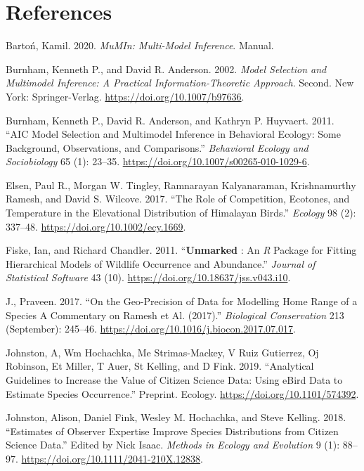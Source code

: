 \documentclass[
]{article}
\begin{document}
\clearpage

\hypertarget{references}{%
\section{References}\label{references}}

\hypertarget{refs}{}
\leavevmode\hypertarget{ref-MuMIn}{}%
Bartoń, Kamil. 2020. \emph{MuMIn: Multi-Model Inference}. Manual.

\leavevmode\hypertarget{ref-burnham2002a}{}%
Burnham, Kenneth P., and David R. Anderson. 2002. \emph{Model Selection and Multimodel Inference: A Practical Information-Theoretic Approach}. Second. New York: Springer-Verlag. \url{https://doi.org/10.1007/b97636}.

\leavevmode\hypertarget{ref-burnham2011}{}%
Burnham, Kenneth P., David R. Anderson, and Kathryn P. Huyvaert. 2011. ``AIC Model Selection and Multimodel Inference in Behavioral Ecology: Some Background, Observations, and Comparisons.'' \emph{Behavioral Ecology and Sociobiology} 65 (1): 23--35. \url{https://doi.org/10.1007/s00265-010-1029-6}.

\leavevmode\hypertarget{ref-elsen2017}{}%
Elsen, Paul R., Morgan W. Tingley, Ramnarayan Kalyanaraman, Krishnamurthy Ramesh, and David S. Wilcove. 2017. ``The Role of Competition, Ecotones, and Temperature in the Elevational Distribution of Himalayan Birds.'' \emph{Ecology} 98 (2): 337--48. \url{https://doi.org/10.1002/ecy.1669}.

\leavevmode\hypertarget{ref-fiske2011}{}%
Fiske, Ian, and Richard Chandler. 2011. ``\textbf{Unmarked} : An \emph{R} Package for Fitting Hierarchical Models of Wildlife Occurrence and Abundance.'' \emph{Journal of Statistical Software} 43 (10). \url{https://doi.org/10.18637/jss.v043.i10}.

\leavevmode\hypertarget{ref-praveenj.2017}{}%
J., Praveen. 2017. ``On the Geo-Precision of Data for Modelling Home Range of a Species A Commentary on Ramesh et Al. (2017).'' \emph{Biological Conservation} 213 (September): 245--46. \url{https://doi.org/10.1016/j.biocon.2017.07.017}.

\leavevmode\hypertarget{ref-johnston2019a}{}%
Johnston, A, Wm Hochachka, Me Strimas-Mackey, V Ruiz Gutierrez, Oj Robinson, Et Miller, T Auer, St Kelling, and D Fink. 2019. ``Analytical Guidelines to Increase the Value of Citizen Science Data: Using eBird Data to Estimate Species Occurrence.'' Preprint. Ecology. \url{https://doi.org/10.1101/574392}.

\leavevmode\hypertarget{ref-johnston2018}{}%
Johnston, Alison, Daniel Fink, Wesley M. Hochachka, and Steve Kelling. 2018. ``Estimates of Observer Expertise Improve Species Distributions from Citizen Science Data.'' Edited by Nick Isaac. \emph{Methods in Ecology and Evolution} 9 (1): 88--97. \url{https://doi.org/10.1111/2041-210X.12838}.
\end{document}
